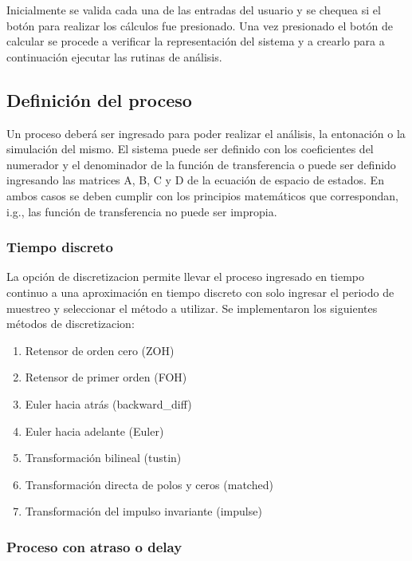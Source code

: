     Inicialmente se valida cada una de las entradas del usuario y se chequea si el botón para realizar los cálculos fue presionado. Una vez presionado el botón de calcular se procede a verificar la representación del sistema y a crearlo para a continuación ejecutar las rutinas de análisis.

    \subsection{Definición del proceso}

        Un proceso deberá ser ingresado para poder realizar el análisis, la entonación o la simulación del mismo. El sistema puede ser definido con los coeficientes del numerador y el denominador de la función de transferencia o puede ser definido ingresando las matrices A, B, C y D de la ecuación de espacio de estados. En ambos casos se deben cumplir con los principios matemáticos que correspondan, i.g., las función de transferencia no puede ser impropia.

    \subsubsection{Tiempo discreto}

        La opción de discretizacion permite llevar el proceso ingresado en tiempo continuo a una aproximación en tiempo discreto con solo ingresar el periodo de muestreo y seleccionar el método a utilizar. Se implementaron los siguientes métodos de discretizacion:

        \begin{enumerate}[leftmargin=\parindent]
            \item Retensor de orden cero  (ZOH)
            \item Retensor de primer orden (FOH)
            \item Euler hacia atrás (backward\_diff)
            \item Euler hacia adelante (Euler)
            \item Transformación bilineal (tustin)
            \item Transformación directa de polos y ceros (matched)
            \item Transformación del impulso invariante (impulse)
        \end{enumerate}

    \subsubsection{Proceso con atraso o delay}
        
